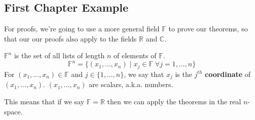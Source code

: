 \subsection{First Chapter Example}

For proofs, we're going to use a more general field $ \mathbb{F} $ to prove our theorems, so that our our proofs also apply to the fields $ \mathbb{R} $ and $ \mathbb{C} $. 

\begin{definition}
	$ \mathbb{F}^n $ is the set of all lists of length $ n $ of elements of $ \mathbb{F} $.
	\[
		\mathbb{F}^n = \{ \left( x_1, \dots, x_n \right) \; | \; x_j \in \mathbb{F} \; \forall j = 1, \dots, n \}
	\]
	For $ (x_1, \dots, x_n) \in \mathbb{F} $ and $ j \in \{ 1, \dots, n \} $, we say that $ x_j $ is the $ j^{th} $ \textbf{coordinate} of $ (x_1, \dots, x_n) $. $ (x_1, \dots, x_n) $ are scalars, a.k.a. numbers.
\end{definition}

This means that if we say $ \mathbb{F} = \mathbb{R} $ then we can apply the theorems in the real $ n $-space.

